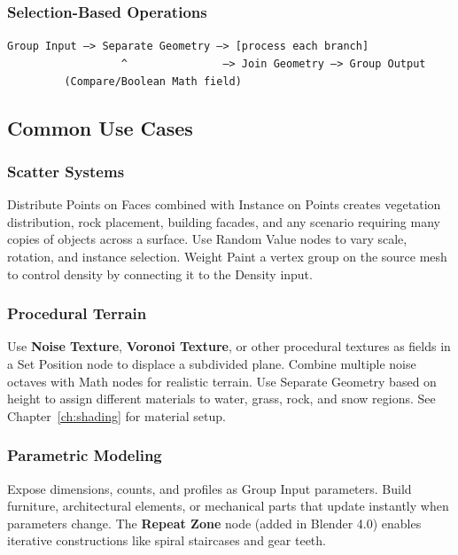 \subsubsection{Selection-Based Operations}

\begin{codebox}
\texttt{Group Input --> Separate Geometry --> [process each branch]}\\
\texttt{\ \ \ \ \ \ \ \ \ \ \ \ \ \ \ \ \ \ \^{}\ \ \ \ \ \ \ \ \ \ \ \ \ \ \ --> Join Geometry --> Group Output}\\
\texttt{\ \ \ \ \ \ \ \ \ (Compare/Boolean Math field)}
\end{codebox}

\subsection{Common Use Cases}
\label{sec:gnusecases}

\subsubsection{Scatter Systems}

Distribute Points on Faces combined with Instance on Points creates vegetation distribution, rock placement, building facades, and any scenario requiring many copies of objects across a surface. Use Random Value nodes to vary scale, rotation, and instance selection. Weight Paint a vertex group on the source mesh to control density by connecting it to the Density input.

\subsubsection{Procedural Terrain}

Use \textbf{Noise Texture}, \textbf{Voronoi Texture}, or other procedural textures as fields in a Set Position node to displace a subdivided plane. Combine multiple noise octaves with Math nodes for realistic terrain. Use Separate Geometry based on height to assign different materials to water, grass, rock, and snow regions. See Chapter~\ref{ch:shading} for material setup.

\subsubsection{Parametric Modeling}

Expose dimensions, counts, and profiles as Group Input parameters. Build furniture, architectural elements, or mechanical parts that update instantly when parameters change. The \textbf{Repeat Zone} node (added in Blender 4.0) enables iterative constructions like spiral staircases and gear teeth.

